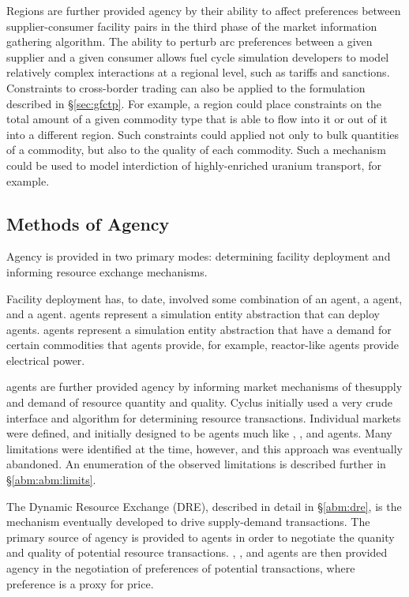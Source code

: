 Regions are further provided agency by their ability to affect preferences
between supplier-consumer facility pairs in the third phase of the market
information gathering algorithm. The ability to perturb arc preferences between
a given supplier and a given consumer allows fuel cycle simulation developers to
model relatively complex interactions at a regional level, such as tariffs and
sanctions. Constraints to cross-border trading can also be applied to the
formulation described in \S\ref{sec:gfctp}. For example, a region could place
constraints on the total amount of a given commodity type that is able to flow
into it or out of it into a different region. Such constraints could applied not
only to bulk quantities of a commodity, but also to the quality of each
commodity. Such a mechanism could be used to model interdiction of
highly-enriched uranium transport, for example.

\subsection{Methods of Agency}

Agency is provided in two primary modes: determining facility deployment and
informing resource exchange mechanisms. 

Facility deployment has, to date, involved some combination of an
 agent, a  agent, and a 
agent.  agents represent a simulation entity abstraction that
can deploy  agents.  agents represent a simulation
entity abstraction that have a demand for certain commodities that
 agents provide, for example, reactor-like  agents
provide electrical power.

 agents are further provided agency by informing market
mechanisms of thesupply and demand of resource quantity and quality. Cyclus
initially used a very crude interface and algorithm for determining resource
transactions. Individual markets were defined, and initially designed to be
agents much like , , and 
agents. Many limitations were identified at the time, however, and this approach
was eventually abandoned. An enumeration of the observed limitations is
described further in \S \ref{abm:abm:limits}.

The Dynamic Resource Exchange (DRE), described in detail in \S \ref{abm:dre}, is
the mechanism eventually developed to drive supply-demand transactions. The
primary source of agency is provided to  agents in order to
negotiate the quanity and quality of potential resource
transactions. , , and  agents are
then provided agency in the negotiation of preferences of potential
transactions, where preference is a proxy for price.

